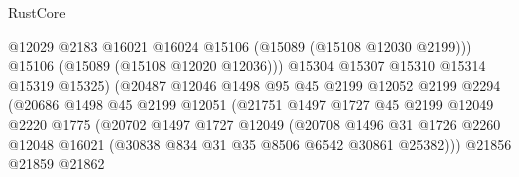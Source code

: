 \begin{lexlean}{RustCore}
\begin{coremodule}
                                            @12029
                                            @2183
                                            @16021
                                            @16024
                                            @15106
                                            (@15089 (@15108 @12030 @2199)))
                                          @15106
                                          (@15089 (@15108 @12020 @12036)))
                                        @15304
                                        @15307
                                        @15310
                                        @15314
                                        @15319
                                        @15325)
                                      (@20487
                                        @12046
                                        @1498
                                        @95
                                        @45
                                        @2199
                                        @12052
                                        @2199
                                        @2294
                                        (@20686
                                          @1498
                                          @45
                                          @2199
                                          @12051
                                          (@21751
                                            @1497
                                            @1727
                                            @45
                                            @2199
                                            @12049
                                            @2220
                                            @1775
                                            (@20702
                                              @1497
                                              @1727
                                              @12049
                                              (@20708
                                                @1496
                                                @31
                                                @1726
                                                @2260
                                                @12048
                                                @16021
                                                (@30838 @834 @31 @35 @8506 @6542 @30861 @25382)))
                                            @21856
                                            @21859
                                            @21862

\end{coremodule}
\end{lexlean}
